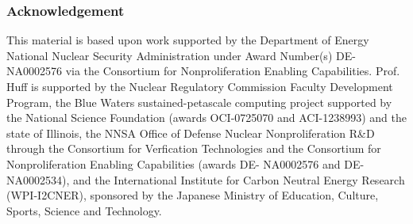 \begin{frame}
  \frametitle{Acknowledgement}
        This material is based upon work supported by
        the Department of Energy National Nuclear Security
        Administration under Award Number(s) DE-NA0002576 via
        the Consortium for Nonproliferation Enabling Capabilities.
        \newline
        \newline
        Prof. Huff is supported by the Nuclear Regulatory
        Commission Faculty Development Program, the Blue Waters
        sustained-petascale computing project supported by the
        National Science Foundation (awards OCI-0725070 and
        ACI-1238993) and the state of Illinois, the NNSA Office
        of Defense Nuclear Nonproliferation R\&D through the
        Consortium for Verfication Technologies and the Consortium
        for Nonproliferation Enabling Capabilities (awards DE-
        NA0002576 and DE-NA0002534), and the International
        Institute for Carbon Neutral Energy Research (WPI-I2CNER),
        sponsored by the Japanese Ministry of Education, Culture,
        Sports, Science and Technology.
\end{frame}
